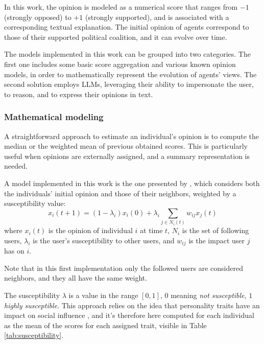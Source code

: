\medskip
In this work, the opinion is modeled as a numerical score that ranges from $-1$ (strongly opposed) to $+1$ (strongly supported), and is associated with a corresponding textual explanation.
The initial opinion of agents correspond to those of their supported political coalition, and it can evolve over time.

\medskip
The models implemented in this work can be grouped into two categories.
The first one includes some basic score aggregation and various known opinion models, in order to mathematically represent the evolution of agents' views.
The second solution employs LLMs, leveraging their ability to impersonate the user, to reason, and to express their opinions in text.


\subsubsection{Mathematical modeling}
A straightforward approach to estimate an individual's opinion is to compute the median or the weighted mean of previous obtained scores.
This is particularly useful when opinions are externally assigned, and a summary representation is needed.

\medskip
A model implemented in this work is the one presented by \citet{friedkin_1990}, which considers both the individuals' initial opinion and those of their neighbors, weighted by a susceptibility value:
\[
x_i(t + 1) = (1 - \lambda_i) x_i(0) + \lambda_i   \sum_{j \in N_i(t)} w_{ij} x_j(t)
\]
where $x_i(t)$ is the opinion of individual $i$ at time $t$, $N_i$ is the set of following users, $\lambda_i$ is the user's susceptibility to other users, and $w_{ij}$ is the impact user $j$ has on $i$. 

Note that in this first implementation only the followed users are considered neighbors, and they all have the same weight.

The susceptibility $\lambda$ is a value in the range $[0,1]$, $0$ meaning \textit{not susceptible}, $1$ \textit{highly susceptible}.
This approach relies on the idea that personality traits have an impact on social influence \cite{oyibo2019personality}, and it's therefore here computed for each individual as the mean of the scores for each assigned trait, visible in Table \ref{tab:susceptibility}.

